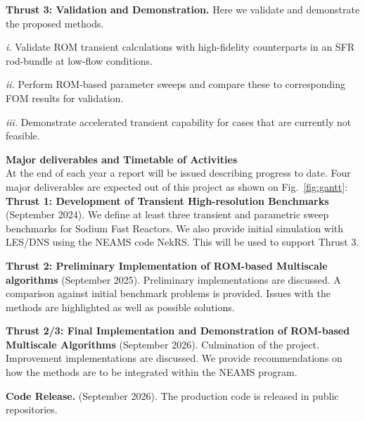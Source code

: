 \textbf{Thrust 3: Validation and Demonstration.} 
Here we validate and demonstrate the proposed methods.
\\[-5ex]
\begin{description}
\item{\em i.}
Validate ROM transient calculations with high-fidelity counterparts
in an SFR rod-bundle at low-flow conditions.
\\[-4ex]
\item{\em ii.}
Perform ROM-based parameter sweeps and compare these to corresponding
FOM results for validation.
\\[-4ex]
\item{\em iii.}
Demonstrate accelerated transient capability for cases that are currently not
feasible.  
\\[-3ex]
\end{description}

\textbf{Major deliverables and Timetable of Activities} \\
At the end of each year a report will be issued describing progress to date.
Four major deliverables are expected out of this project as shown on
Fig.~\ref{fig:gantt}: \\

\vspace*{-.10in}
\noindent \textbf{Thrust 1: Development of Transient High-resolution
Benchmarks} (September 2024). We define at least three transient and parametric
sweep benchmarks for Sodium Fast Reactors. We also provide initial simulation
with LES/DNS using the NEAMS code NekRS. This will be used to support Thrust 3.

\noindent \textbf{Thrust 2: Preliminary Implementation of ROM-based Multiscale
algorithms} (September 2025). Preliminary implementations are discussed. A
comparison against initial benchmark problems is provided. Issues with the
methods are highlighted as well as possible solutions.

\noindent \textbf{Thrust 2/3: Final Implementation and Demonstration of
ROM-based Multiscale Algorithms} (September 2026). 
Culmination of the project. Improvement implementations are discussed. We
provide recommendations on how the methods are to be integrated within the
NEAMS program.

\noindent \textbf{Code Release.} (September 2026). The production code is
released in public repositories.

